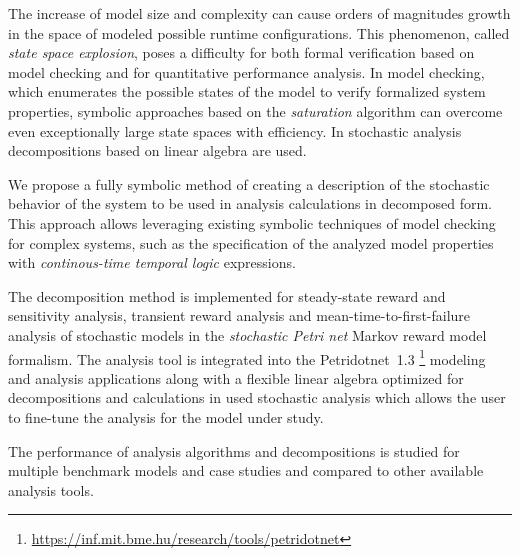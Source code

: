 The increase of model size and complexity can cause orders of
magnitudes growth in the space of modeled possible runtime
configurations. This phenomenon, called \emph{state space explosion},
poses a difficulty for both formal verification based on model
checking and for quantitative performance analysis. In model checking,
which enumerates the possible states of the model to verify formalized
system properties, symbolic approaches based on the \emph{saturation}
algorithm can overcome even exceptionally large state spaces with
efficiency. In stochastic analysis decompositions based on linear
algebra are used.

We propose a fully symbolic method of creating a description of the
stochastic behavior of the system to be used in analysis calculations
in decomposed form. This approach allows leveraging existing symbolic
techniques of model checking for complex systems, such as the
specification of the analyzed model properties with
\emph{continous-time temporal logic}  expressions.

The decomposition method is implemented for steady-state reward and
sensitivity analysis, transient reward analysis and
mean-time-to-first-failure analysis of stochastic models in the
\emph{stochastic Petri net}  Markov reward model
formalism. The analysis tool is integrated into the Petridotnet~1.3%
\footnote{\url{https://inf.mit.bme.hu/research/tools/petridotnet}}
modeling and analysis applications along with a flexible linear
algebra optimized for decompositions and calculations in used
stochastic analysis which allows the user to fine-tune the analysis
for the model under study.

The performance of analysis algorithms and decompositions is studied
for multiple benchmark models and case studies and compared to other
available analysis tools.